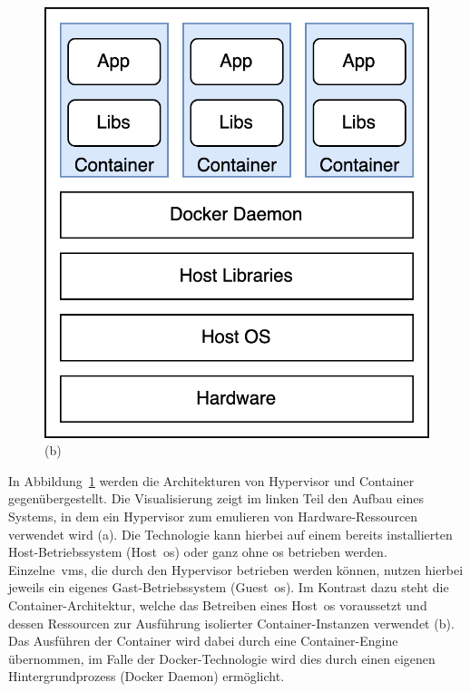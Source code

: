 \begin{figure}[H]
\begin{minipage}{0.4\textwidth}
        \includegraphics[width=\linewidth]{images/content/container-architecture}
        \captionsetup{justification=raggedright,singlelinecheck=false}%
        \vspace{-0.7cm}%
        \caption*{(b)}
    \end{minipage}
    \label{fig:vm-container-architecture}
\end{figure}

In Abbildung\ \ref{fig:vm-container-architecture} werden die Architekturen von Hypervisor und Container
gegenübergestellt.
Die Visualisierung zeigt im linken Teil den Aufbau eines Systems, in dem ein Hypervisor zum emulieren von
Hardware-Ressourcen verwendet wird (a).
Die Technologie kann hierbei auf einem bereits installierten Host-Betriebssystem (Host\ \acrshort{os}) oder ganz ohne
\acrshort{os} betrieben werden.
Einzelne\ \acrshort{vm}s, die durch den Hypervisor betrieben werden können, nutzen hierbei jeweils ein eigenes
Gast-Betriebssystem (Guest\ \acrshort{os}).
Im Kontrast dazu steht die Container-Architektur, welche das Betreiben eines Host\ \acrshort{os} voraussetzt und
dessen Ressourcen zur Ausführung isolierter Container-Instanzen verwendet (b).
Das Ausführen der Container wird dabei durch eine Container-Engine übernommen, im Falle der Docker-Technologie wird
dies durch einen eigenen Hintergrundprozess (Docker Daemon) ermöglicht.

